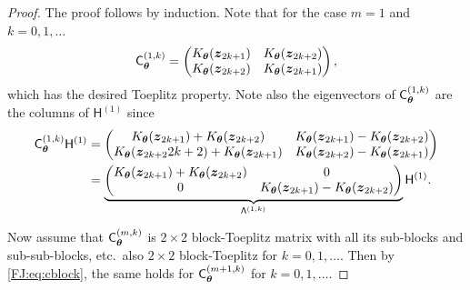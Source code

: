 \documentclass[graybox,footinfo]{svmult}
\begin{document}
\begin{proof}
    The proof follows by induction.  Note that for the case $m=1$ and $k = 0, 1, \ldots$
    \begin{equation*}
        \mathsf{C}_{{\boldsymbol{\theta}}}^{(1,k)} 
        =  \begin{pmatrix}
        K_{\boldsymbol{\theta}}({\boldsymbol{z}}_{2k+1}) & K_{\boldsymbol{\theta}}({\boldsymbol{z}}_{2k+2}) \\
        K_{\boldsymbol{\theta}}({\boldsymbol{z}}_{2k+2}) & K_{\boldsymbol{\theta}}({\boldsymbol{z}}_{2k+1}) 
        \end{pmatrix} ,
    \end{equation*}
   which has the desired Toeplitz property. Note also the eigenvectors of $\mathsf{C}_{{\boldsymbol{\theta}}}^{(1,k)}$ are the columns of $\mathsf{H}^{(1)}$ since   
   \begin{align*}
        \mathsf{C}_{{\boldsymbol{\theta}}}^{(1,k)} \mathsf{H}^{(1)} & =  \begin{pmatrix}
        K_{\boldsymbol{\theta}}({\boldsymbol{z}}_{2k+1}) + K_{\boldsymbol{\theta}}({\boldsymbol{z}}_{2k+2}) & K_{\boldsymbol{\theta}}({\boldsymbol{z}}_{2k+1}) - K_{\boldsymbol{\theta}}({\boldsymbol{z}}_{2k+2})\\
        K_{\boldsymbol{\theta}}({\boldsymbol{z}}_{2k+2}{2k+2}) + K_{\boldsymbol{\theta}}({\boldsymbol{z}}_{2k+1}) &  K_{\boldsymbol{\theta}}({\boldsymbol{z}}_{2k+2}) - K_{\boldsymbol{\theta}}({\boldsymbol{z}}_{2k+1}) 
        \end{pmatrix} \\
        & = \underbrace{\begin{pmatrix}
        K_{\boldsymbol{\theta}}({\boldsymbol{z}}_{2k+1}) + K_{\boldsymbol{\theta}}({\boldsymbol{z}}_{2k+2}) & 0\\
        0 &   K_{\boldsymbol{\theta}}({\boldsymbol{z}}_{2k+1}) - K_{\boldsymbol{\theta}}({\boldsymbol{z}}_{2k+2})
        \end{pmatrix}}_{\mathsf{\Lambda}^{(1,k)}} \mathsf{H}^{(1)}.
    \end{align*}

   Now assume that $\mathsf{C}_{{\boldsymbol{\theta}}}^{(m,k)}$ is $2\times 2$ block-Toeplitz matrix with all its sub-blocks and sub-sub-blocks, etc.\ also $2\times 2$ block-Toeplitz for $k = 0, 1, \ldots$.  Then by \eqref{FJ:eq:cblock}, the same holds for $\mathsf{C}_{{\boldsymbol{\theta}}}^{(m+1,k)}$ for $k = 0, 1, \ldots$. 
   

\end{proof}
\end{document}
